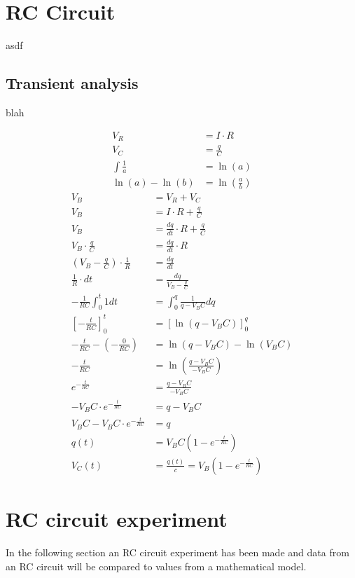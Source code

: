 \section{RC Circuit}
asdf
\subsection{Transient analysis}
blah

\begin{align}
V_R &= I \cdot R \\
V_C &= \frac{q}{C} \\
\int \frac{1}{a} &= \ln(a) \\
\ln(a) - \ln(b) &= \ln(\frac{a}{b})
\end{align}
\begin{align*}
V_B &= V_R + V_C \\
V_B &= I \cdot R + \frac{q}{C} \\
V_B &= \frac{dq}{dt} \cdot R + \frac{q}{C} \\
V_B \cdot \frac{q}{C} &= \frac{dq}{dt} \cdot R \\
(V_B - \frac{q}{C}) \cdot \frac{1}{R} &= \frac{dq}{dt} \\
\frac{1}{R} \cdot dt &= \frac{dq}{V_B - \frac{q}{C}} \\
- \frac{1}{RC} \int_{0}^{t} 1 dt &= \int_{0}^{q} \frac{1}{q-V_B C}dq \\
[-\frac{t}{RC}]_{0}^{t} &= [\ln(q-V_B C)]_{0}^{q} \\
-\frac{t}{RC} - (-\frac{0}{RC}) &= \ln(q-V_B C) - \ln(V_B C) \\
-\frac{t}{RC} &= \ln(\frac{q-V_B C}{-V_B C}) \\
e^{-\frac{t}{RC}} &= \frac{q-V_B C}{-V_B C} \\
-V_B C \cdot e^{-\frac{t}{RC}} &= q - V_B C \\
V_B C - V_B C \cdot e^{-\frac{t}{RC}} &= q \\
q(t) &= V_B C(1-e^{-\frac{t}{RC}}) \\
V_C(t) &= \frac{q(t)}{c} = V_B (1 - e^{-\frac{t}{RC}})
\end{align*}

\section{RC circuit experiment}
In the following section an RC circuit experiment has been made and data from an RC circuit will be compared to values from a mathematical model. \\
